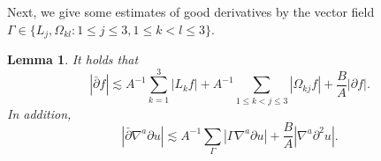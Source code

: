 \documentclass[11pt,twoside]{article}
\theoremstyle{plain}
\newtheorem{lemma}[theorem]{Lemma}
\theoremstyle{definition}
\theoremstyle{assumption}
\numberwithin{equation}{section}
\begin{document}
	
	
	
	Next, we give some estimates of good derivatives by the vector field
$\Gamma\in\{L_j,\Omega_{kl}: 1\le j\le3, 1\le k<l\le3\}$.
	
	
	
		
	\begin{lemma}\label{lem:good-derivative-one-Gamma}
		It holds that
		\begin{equation}\label{eq:good-derivative-Gamma-correct}
			|\bar\partial f|
			\lesssim
			A^{-1}\sum_{k=1}^3 |L_k f|
			+A^{-1}\sum_{1\le k<j\le3}|\Omega_{kj}f|
			+\frac{B}{A}|\partial f|.
		\end{equation}
		In addition,
		\begin{equation}\label{eq:good-derivative-applied}
			|\bar\partial\nabla^a \partial u|
			\lesssim
			A^{-1}\sum_{\Gamma}|\Gamma\nabla^a \partial u|
			+\frac{B}{A}|\nabla^a\partial^2 u|.
		\end{equation}
		
	\end{lemma}
	
\end{document}
